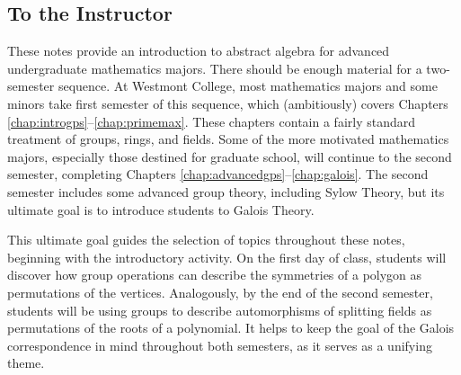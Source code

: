 \tableofcontents


\begin{annotation}
 \chapter{To the Instructor}

These notes provide an introduction to abstract algebra for advanced undergraduate mathematics majors. There should be enough material for a two-semester sequence. At Westmont College, most mathematics majors and some minors take first semester of this sequence, which (ambitiously) covers Chapters \ref{chap:introgps}--\ref{chap:primemax}. These chapters contain a fairly standard treatment of groups, rings, and fields. Some of the more motivated mathematics majors, especially those destined for graduate school, will continue to the second semester, completing Chapters \ref{chap:advancedgps}--\ref{chap:galois}. The second semester includes some advanced group theory, including Sylow Theory, but its ultimate goal is to introduce students to Galois Theory.

This ultimate goal guides the selection of topics throughout these notes, beginning with the introductory activity. On the first day of class, students will discover how group operations can describe the symmetries of a polygon as permutations of the vertices. Analogously, by the end of the second semester, students will be using groups to describe automorphisms of splitting fields as permutations of the roots of a polynomial. It helps to keep the goal of the Galois correspondence in mind throughout both semesters, as it serves as a unifying theme.


\end{annotation}
